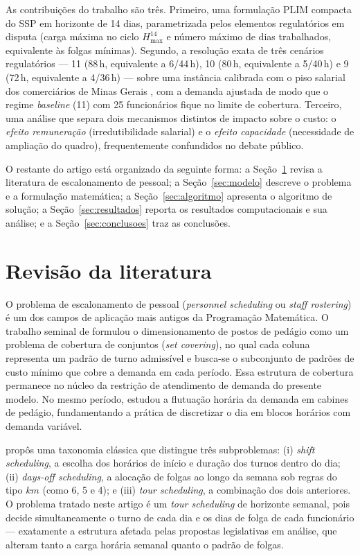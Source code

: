 \documentclass[12pt,a4paper]{article}
\begin{document}
As contribuições do trabalho são três. Primeiro, uma formulação PLIM compacta
do SSP em horizonte de 14 dias, parametrizada pelos elementos regulatórios em
disputa (carga máxima no ciclo $H_{\max}^{14}$ e número máximo de dias
trabalhados, equivalente às folgas mínimas). Segundo, a resolução exata de
três cenários regulatórios --- 11 (88\,h, equivalente a
6/44\,h), 10 (80\,h, equivalente a
5/40\,h) e 9 (72\,h, equivalente a
4/36\,h) --- sobre uma instância calibrada com o piso salarial
dos comerciários de Minas Gerais \cite{fecomercio}, com a demanda ajustada de
modo que o regime \emph{baseline} (11) com 25 funcionários fique
no limite de cobertura. Terceiro, uma análise que separa dois mecanismos
distintos de impacto sobre o custo: o \emph{efeito remuneração}
(irredutibilidade salarial) e o \emph{efeito capacidade} (necessidade de
ampliação do quadro), frequentemente confundidos no debate público.

O restante do artigo está organizado da seguinte forma: a
Seção~\ref{sec:revisao} revisa a literatura de escalonamento de pessoal; a
Seção~\ref{sec:modelo} descreve o problema e a formulação matemática; a
Seção~\ref{sec:algoritmo} apresenta o algoritmo de solução; a
Seção~\ref{sec:resultados} reporta os resultados computacionais e sua
análise; e a Seção~\ref{sec:conclusoes} traz as conclusões.

\section{Revisão da literatura}
\label{sec:revisao}

O problema de escalonamento de pessoal (\emph{personnel scheduling} ou
\emph{staff rostering}) é um dos campos de aplicação mais antigos da
Programação Matemática. O trabalho seminal de \cite{dantzig1954} formulou o
dimensionamento de postos de pedágio como um problema de cobertura de
conjuntos (\emph{set covering}), no qual cada coluna representa um padrão de
turno admissível e busca-se o subconjunto de padrões de custo mínimo que
cobre a demanda em cada período. Essa estrutura de cobertura permanece no
núcleo da restrição de atendimento de demanda do presente modelo. No mesmo
período, \cite{edie1954} estudou a flutuação horária da demanda em cabines de
pedágio, fundamentando a prática de discretizar o dia em blocos horários com
demanda variável.

\cite{baker1976} propôs uma taxonomia clássica que distingue três
subproblemas: (i) \emph{shift scheduling}, a escolha dos horários de início e
duração dos turnos dentro do dia; (ii) \emph{days-off scheduling}, a alocação
de folgas ao longo da semana sob regras do tipo $k$\texttimes$m$ (como
6, 5 e 4); e (iii) \emph{tour
scheduling}, a combinação dos dois anteriores. O problema tratado neste
artigo é um \emph{tour scheduling} de horizonte semanal, pois decide
simultaneamente o turno de cada dia e os dias de folga de cada funcionário
--- exatamente a estrutura afetada pelas propostas legislativas em análise,
que alteram tanto a carga horária semanal quanto o padrão de folgas.
\end{document}
